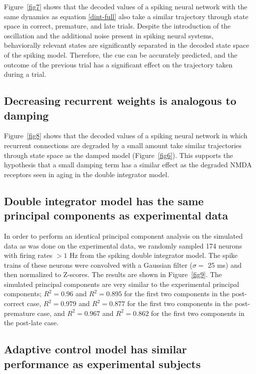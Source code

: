 \documentclass[11pt]{article}
\begin{document}
Figure~\ref{fig7} shows that
the decoded values of a spiking neural network
with the same dynamics as equation \eqref{dint-full}
also take a similar trajectory through
state space in correct, premature, and late trials.
Despite the introduction of the oscillation
and the additional noise present
in spiking neural systems,
behaviorally relevant states
are significantly separated
in the decoded state space of the spiking model.
Therefore, the cue can be accurately predicted,
and the outcome of the previous trial
has a significant effect
on the trajectory taken during a trial.

\subsection{Decreasing recurrent weights is analogous to damping}

Figure~\ref{fig8} shows that
the decoded values of a spiking neural network
in which recurrent connections are degraded
by a small amount
take similar trajectories through state space
as the damped model (Figure~\ref{fig6}).
This supports the hypothesis
that a small damping term
has a similar effect as
the degraded NMDA receptors seen in aging
in the double integrator model.

\subsection{Double integrator model has the same principal components as experimental data}

In order to perform an identical
principal component analysis
on the simulated data as was done
on the experimental data,
we randomly sampled 174 neurons
with firing rates $> 1$ Hz from
the spiking double integrator model.
The spike trains of these neurons
were convolved with a Gaussian filter ($\sigma = $ 25 ms)
and then normalized to Z-scores.
The results are shown in Figure~\ref{fig9}.
The simulated principal components
are very similar to the experimental principal components;
$R^2 = 0.96$ and $R^2 = 0.895$ for
the first two components in the post-correct case,
$R^2 = 0.979$ and $R^2 = 0.877$ for
the first two components in the post-premature case,
and $R^2 = 0.967$ and $R^2 = 0.862$ for
the first two components in the post-late case.

\subsection{Adaptive control model has similar performance as experimental subjects}
\end{document}
